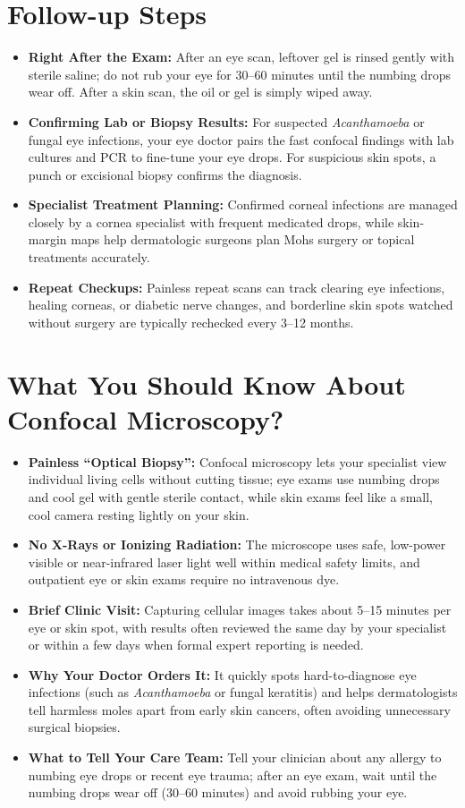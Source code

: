 \section{Follow-up Steps}
\begin{itemize}
    \item \textbf{Right After the Exam:} After an eye scan, leftover gel is rinsed gently with sterile saline; do not rub your eye for 30--60 minutes until the numbing drops wear off. After a skin scan, the oil or gel is simply wiped away.
    \item \textbf{Confirming Lab or Biopsy Results:} For suspected \textit{Acanthamoeba} or fungal eye infections, your eye doctor pairs the fast confocal findings with lab cultures and PCR to fine-tune your eye drops. For suspicious skin spots, a punch or excisional biopsy confirms the diagnosis.
    \item \textbf{Specialist Treatment Planning:} Confirmed corneal infections are managed closely by a cornea specialist with frequent medicated drops, while skin-margin maps help dermatologic surgeons plan Mohs surgery or topical treatments accurately.
    \item \textbf{Repeat Checkups:} Painless repeat scans can track clearing eye infections, healing corneas, or diabetic nerve changes, and borderline skin spots watched without surgery are typically rechecked every 3--12 months.
\end{itemize}

\section{What You Should Know About Confocal Microscopy?}
\begin{itemize}
    \item \textbf{Painless ``Optical Biopsy'':} Confocal microscopy lets your specialist view individual living cells without cutting tissue; eye exams use numbing drops and cool gel with gentle sterile contact, while skin exams feel like a small, cool camera resting lightly on your skin.
    \item \textbf{No X-Rays or Ionizing Radiation:} The microscope uses safe, low-power visible or near-infrared laser light well within medical safety limits, and outpatient eye or skin exams require no intravenous dye.
    \item \textbf{Brief Clinic Visit:} Capturing cellular images takes about 5--15 minutes per eye or skin spot, with results often reviewed the same day by your specialist or within a few days when formal expert reporting is needed.
    \item \textbf{Why Your Doctor Orders It:} It quickly spots hard-to-diagnose eye infections (such as \textit{Acanthamoeba} or fungal keratitis) and helps dermatologists tell harmless moles apart from early skin cancers, often avoiding unnecessary surgical biopsies.
    \item \textbf{What to Tell Your Care Team:} Tell your clinician about any allergy to numbing eye drops or recent eye trauma; after an eye exam, wait until the numbing drops wear off (30--60 minutes) and avoid rubbing your eye.
\end{itemize}

